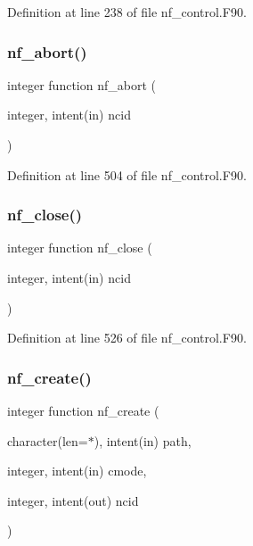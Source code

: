 Definition at line 238 of file nf\+\_\+control.\+F90.

\mbox{\label{nf__control_8F90_adb314a3785bb1f9c74796c4d433734b5}} 
\subsubsection{\texorpdfstring{nf\+\_\+abort()}{nf\_abort()}}
{\footnotesize\ttfamily integer function nf\+\_\+abort (\begin{DoxyParamCaption}\item[{integer, intent(in)}]{ncid }\end{DoxyParamCaption})}



Definition at line 504 of file nf\+\_\+control.\+F90.

\mbox{\label{nf__control_8F90_a0b56f2b46ddbb26498d532776af44fd0}} 
\subsubsection{\texorpdfstring{nf\+\_\+close()}{nf\_close()}}
{\footnotesize\ttfamily integer function nf\+\_\+close (\begin{DoxyParamCaption}\item[{integer, intent(in)}]{ncid }\end{DoxyParamCaption})}



Definition at line 526 of file nf\+\_\+control.\+F90.

\mbox{\label{nf__control_8F90_a923c7fd77ba66d8b04141dfc70dc1e6a}} 
\subsubsection{\texorpdfstring{nf\+\_\+create()}{nf\_create()}}
{\footnotesize\ttfamily integer function nf\+\_\+create (\begin{DoxyParamCaption}\item[{character(len=$\ast$), intent(in)}]{path,  }\item[{integer, intent(in)}]{cmode,  }\item[{integer, intent(out)}]{ncid }\end{DoxyParamCaption})}



